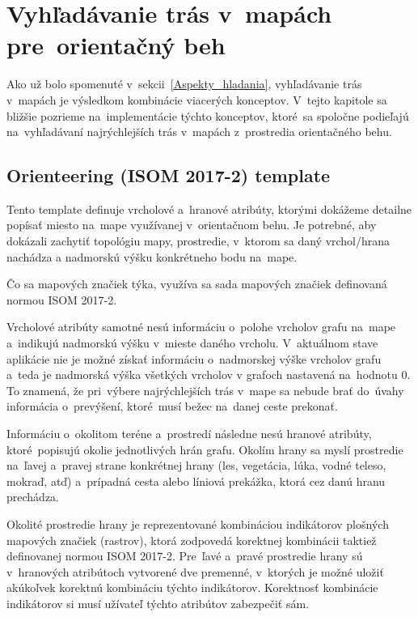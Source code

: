 \chapter{Vyhľadávanie trás v~mapách pre~orientačný beh}

Ako už bolo spomenuté v~sekcii~\ref{Aspekty_hladania}, vyhľadávanie trás v~mapách je výsledkom kombinácie viacerých konceptov. V~tejto kapitole sa bližšie pozrieme na~implementácie týchto konceptov, ktoré~sa spoločne podieľajú na~vyhľadávaní najrýchlejších trás v~mapách z~prostredia orientačného behu.

\section{Orienteering (ISOM 2017-2) template}

Tento template definuje vrcholové a~hranové atribúty, ktorými dokážeme detailne popísať miesto na~mape využívanej v~orientačnom behu. Je potrebné, aby dokázali zachytiť topológiu mapy, prostredie, v~ktorom sa daný vrchol/hrana nachádza a nadmorskú výšku konkrétneho bodu na~mape.  

Čo sa mapových značiek týka, využíva sa sada mapových značiek definovaná normou ISOM 2017-2. \cite{ISOM20172}

Vrcholové atribúty samotné nesú informáciu o~polohe vrcholov grafu na~mape a~indikujú nadmorskú výšku v~mieste daného vrcholu. V~aktuálnom stave aplikácie nie je možné získať informáciu o~nadmorskej výške vrcholov grafu a~teda je nadmorská výška všetkých vrcholov v grafoch nastavená na~hodnotu 0. To znamená, že pri~výbere najrýchlejších trás v~mape sa nebude brať do~úvahy informácia o~prevýšení, ktoré~musí bežec na~danej ceste prekonať.

Informáciu o~okolitom teréne a~prostredí následne nesú hranové atribúty, ktoré~popisujú okolie jednotlivých hrán grafu. Okolím hrany sa myslí prostredie na~ľavej a~pravej strane konkrétnej hrany (les, vegetácia, lúka, vodné teleso, mokraď, atď) a~prípadná cesta alebo líniová prekážka, ktorá cez danú hranu prechádza.

Okolité prostredie hrany je reprezentované kombináciou indikátorov plošných mapových značiek (rastrov), ktorá zodpovedá korektnej kombinácii taktiež definovanej normou ISOM 2017-2. Pre~ľavé a~pravé prostredie hrany sú v~hranových atribútoch vytvorené dve premenné, v~ktorých je možné uložiť akúkoľvek korektnú kombináciu týchto indikátorov. Korektnosť kombinácie indikátorov si musí užívateľ týchto atribútov zabezpečiť sám.  

